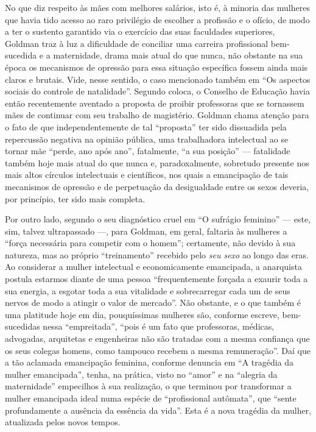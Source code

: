 No que diz respeito às mães com melhores salários, isto é, à minoria das
mulheres que havia tido acesso ao raro privilégio de escolher a
profissão e o ofício, de modo a ter o sustento garantido via o exercício
das suas faculdades superiores, Goldman traz à luz a dificuldade de
conciliar uma carreira profissional bem-sucedida e a maternidade, drama
mais atual do que nunca, não obstante na sua época os mecanismos de
opressão para essa situação específica fossem ainda mais claros e
brutais. Vide, nesse sentido, o caso mencionado também em ``Os aspectos
sociais do controle de natalidade''. Segundo coloca, o Conselho de
Educação havia então recentemente aventado a proposta de proibir
professoras que se tornassem mães de continuar com seu trabalho de
magistério. Goldman chama atenção para o fato de que independentemente
de tal ``proposta'' ter sido dissuadida pela repercussão negativa na
opinião pública, uma trabalhadora intelectual ao se tornar mãe ``perde,
ano após ano'', fatalmente, ``a sua posição'' --- fatalidade também hoje
mais atual do que nunca e, paradoxalmente, sobretudo presente nos mais
altos círculos intelectuais e científicos, nos quais a emancipação de
tais mecanismos de opressão e de perpetuação da desigualdade entre os
sexos deveria, por princípio, ter sido mais completa.

Por outro lado, segundo o seu diagnóstico cruel em ``O sufrágio
feminino'' --- este, sim, talvez ultrapassado ---, para Goldman, em geral,
faltaria às mulheres a ``força necessária para competir com o homem'';
certamente, não devido à sua natureza, mas ao próprio ``treinamento''
recebido pelo \textit{seu sexo} ao longo das eras. Ao considerar a mulher
intelectual e economicamente emancipada, a anarquista postula estarmos
diante de uma pessoa ``frequentemente forçada a exaurir toda a sua
energia, a esgotar toda a sua vitalidade e sobrecarregar cada um de seus
nervos de modo a atingir o valor de mercado''. Não obstante, e o que
também é uma platitude hoje em dia, pouquíssimas mulheres são, conforme
escreve, bem-sucedidas nessa ``empreitada'', ``pois é um fato que
professoras, médicas, advogadas, arquitetas e engenheiras não são
tratadas com a mesma confiança que os seus colegas homens, como tampouco
recebem a mesma remuneração''. Daí que a tão aclamada emancipação
feminina, conforme denuncia em ``A tragédia da mulher emancipada'',
tenha, na prática, visto no ``amor'' e na ``alegria da maternidade''
empecilhos à sua realização, o que terminou por transformar a mulher
emancipada ideal numa espécie de ``profissional autômata'', que ``sente
profundamente a ausência da essência da vida''. Esta é a nova tragédia
da mulher, atualizada pelos novos tempos. 

